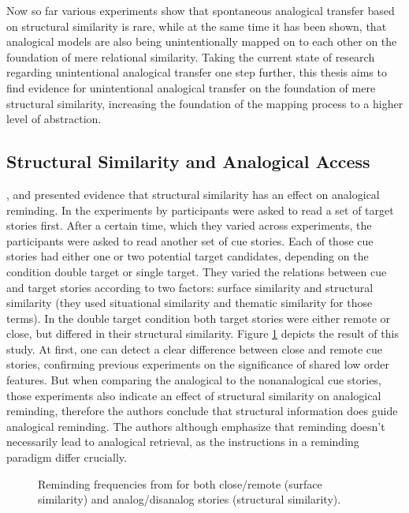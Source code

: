 \documentclass[a4paper,man,natbib,floatsintext,import]{apa6}
\begin{document}
Now so far various experiments show that spontaneous analogical transfer based on structural similarity is rare, while at the same time it has been shown, that analogical models are also being unintentionally mapped on to each other on the foundation of mere relational similarity. Taking the current state of research regarding unintentional analogical transfer one step further, this thesis aims to find evidence for unintentional analogical transfer on the foundation of mere structural similarity, increasing the foundation of the mapping process to a higher level of abstraction.

\subsection{Structural Similarity and Analogical Access}
\cite{Holyoak1987}, \cite{Johnson1992} and \cite{Wharton1996} presented evidence that structural similarity has an effect on analogical reminding. In the experiments by \cite{Wharton1996} participants were asked to read a set of target stories first. After a certain time, which they varied across experiments, the participants were asked to read another set of cue stories. Each of those cue stories had either one or two potential target candidates, depending on the condition double target or single target. They varied the relations between cue and target stories according to two factors: surface similarity and structural similarity (they used situational similarity and thematic similarity for those terms). In the double target condition both target stories were either remote or close, but differed in their structural similarity. Figure \ref{fig:wharton} depicts the result of this study. At first, one can detect a clear difference between close and remote cue stories, confirming previous experiments on the significance of shared low order features. But when comparing the analogical to the nonanalogical cue stories, those experiments also indicate an effect of structural similarity on analogical reminding, therefore the authors conclude that structural information does guide analogical reminding. The authors although emphasize that reminding doesn't necessarily lead to analogical retrieval, as the instructions in a reminding paradigm differ crucially.

\begin{figure}
\centering
\begin{minipage}[t]{0.5\textwidth}
\caption{Reminding frequencies from \cite{Wharton1996} for both close/remote (surface similarity) and analog/disanalog stories (structural similarity).}
\label{fig:wharton}
\end{minipage}
\end{figure}
\end{document}
